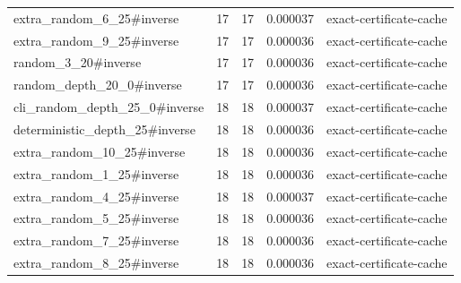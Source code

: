 \begin{tabular}{lrrrl}
extra_random_6_25#inverse & 17 & 17 & 0.000037 & exact-certificate-cache \\
extra_random_9_25#inverse & 17 & 17 & 0.000036 & exact-certificate-cache \\
random_3_20#inverse & 17 & 17 & 0.000036 & exact-certificate-cache \\
random_depth_20_0#inverse & 17 & 17 & 0.000036 & exact-certificate-cache \\
cli_random_depth_25_0#inverse & 18 & 18 & 0.000037 & exact-certificate-cache \\
deterministic_depth_25#inverse & 18 & 18 & 0.000036 & exact-certificate-cache \\
extra_random_10_25#inverse & 18 & 18 & 0.000036 & exact-certificate-cache \\
extra_random_1_25#inverse & 18 & 18 & 0.000036 & exact-certificate-cache \\
extra_random_4_25#inverse & 18 & 18 & 0.000037 & exact-certificate-cache \\
extra_random_5_25#inverse & 18 & 18 & 0.000036 & exact-certificate-cache \\
extra_random_7_25#inverse & 18 & 18 & 0.000036 & exact-certificate-cache \\
extra_random_8_25#inverse & 18 & 18 & 0.000036 & exact-certificate-cache \\
\bottomrule
\end{tabular}
